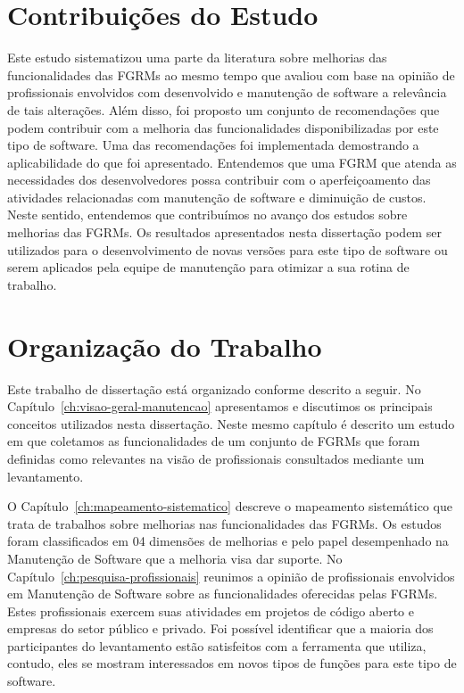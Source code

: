 \section{Contribuições do Estudo}
\label{sec:intro-contribuicao}

Este estudo sistematizou uma parte da literatura sobre melhorias das
funcionalidades das FGRMs ao mesmo tempo que avaliou com base na opinião de
profissionais envolvidos com desenvolvido e manutenção de software a relevância
de tais alterações. Além disso, foi proposto um conjunto de recomendações que
podem contribuir com a melhoria das funcionalidades disponibilizadas por este
tipo de software. Uma das recomendações foi implementada demostrando a
aplicabilidade do que foi apresentado. Entendemos que uma FGRM que atenda as
necessidades dos desenvolvedores possa contribuir com o aperfeiçoamento das
atividades relacionadas com manutenção de software e diminuição de custos. Neste
sentido, entendemos que contribuímos no avanço dos estudos sobre melhorias das
FGRMs. Os resultados apresentados nesta dissertação podem ser utilizados para o
desenvolvimento de novas versões para este tipo de software ou serem aplicados
pela equipe de manutenção para otimizar a sua rotina de trabalho.

\section{Organização do Trabalho}
\label{sec:intro-organizacao-dissertacao}

Este trabalho de dissertação está organizado conforme descrito a seguir. No
Capítulo~\ref{ch:visao-geral-manutencao} apresentamos e discutimos os principais
conceitos utilizados nesta dissertação. Neste mesmo capítulo é descrito um
estudo em que coletamos as funcionalidades de um conjunto de FGRMs que foram
definidas como relevantes na visão de profissionais consultados mediante um
levantamento.

O Capítulo~\ref{ch:mapeamento-sistematico} descreve o mapeamento sistemático que
trata de trabalhos sobre melhorias nas funcionalidades das FGRMs. Os estudos
foram classificados em 04 dimensões de melhorias e pelo papel desempenhado na
Manutenção de Software que a melhoria visa dar suporte. No
Capítulo~\ref{ch:pesquisa-profissionais} reunimos a opinião de profissionais
envolvidos em Manutenção de Software sobre as funcionalidades oferecidas pelas
FGRMs. Estes profissionais exercem suas atividades em projetos de código aberto
e empresas do setor público e privado. Foi possível identificar que a maioria
dos participantes do levantamento estão satisfeitos com a ferramenta que
utiliza, contudo, eles se mostram interessados em novos tipos de funções para
este tipo de software.

